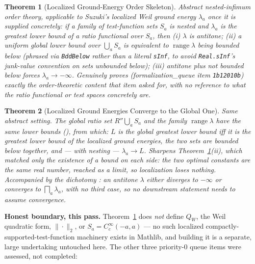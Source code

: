 \documentclass{report}
\newtheorem{theorem}{Theorem}[chapter]
\theoremstyle{definition}
\begin{document}
\begin{theorem}[Localized Ground-Energy Order Skeleton]
  \label{thm:weil-semibound-order-skeleton}
  \leanok
  Abstract nested-infimum order theory, applicable to Suzuki's localized Weil ground energy
  $\lambda_a$ once it is supplied concretely: if a family of test-function sets $S_a$ is
  nested and $\lambda_a$ is the greatest lower bound of a ratio functional over $S_a$, then
  (i) $\lambda$ is antitone; (ii) a uniform global lower bound over $\bigcup_a S_a$ is
  equivalent to $\operatorname{range}\lambda$ being bounded below (phrased via
  \texttt{BddBelow} rather than a literal \texttt{sInf}, to avoid \texttt{Real.sInf}'s
  junk-value convention on sets unbounded below); (iii) antitone plus not bounded below
  forces $\lambda_a\to-\infty$. Genuinely proves (formalization\_queue item \texttt{1b12010b})
  exactly the order-theoretic content that item asked for, with no reference to what the
  ratio functional or test spaces concretely are.
\end{theorem}

\begin{theorem}[Localized Ground Energies Converge to the Global One]
  \label{thm:weil-semibound-sharp-limit}
  \leanok
  Same abstract setting. The global ratio set $R''\bigcup_a S_a$ and the family
  $\operatorname{range}\lambda$ have \emph{the same lower bounds}
  (), from which: $L$ is
  the global greatest lower bound iff it is the greatest lower bound of the localized ground
  energies, the two sets are bounded below together, and --- with nesting --- $\lambda_a\to
  L$. Sharpens Theorem~\ref{thm:weil-semibound-order-skeleton}(ii), which matched only the
  \emph{existence} of a bound on each side: the two \emph{optimal} constants are the same
  real number, reached as a limit, so localization loses nothing. Accompanied by the
  dichotomy : an antitone $\lambda$
  either diverges to $-\infty$ or converges to $\bigsqcap_a\lambda_a$, with no third case, so
  no downstream statement needs to assume convergence.
\end{theorem}

\textbf{Honest boundary, this pass.} Theorem~\ref{thm:weil-semibound-order-skeleton} does
\emph{not} define $Q_W$, the Weil quadratic form, $\|\cdot\|_2$, or
$S_a=C_c^\infty(-a,a)$ --- no such localized compactly-supported-test-function machinery
exists in Mathlib, and building it is a separate, large undertaking untouched here. The
other three priority-0 queue items were assessed, not completed:
\end{document}
